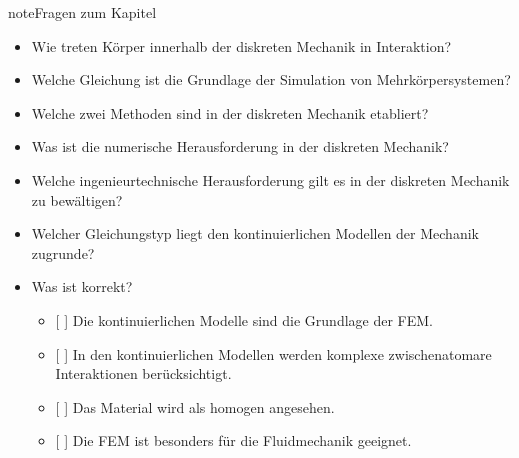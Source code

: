 \documentclass[letterpaper,10pt,german]{jupyterBook}
\begin{document}
\begin{sphinxadmonition}{note}{Fragen zum Kapitel}

\sphinxAtStartPar
{}
\begin{itemize}
\item {} 
\sphinxAtStartPar
Wie treten Körper innerhalb der diskreten Mechanik in Interaktion?

\item {} 
\sphinxAtStartPar
Welche Gleichung ist die Grundlage der Simulation von  Mehrkörpersystemen?

\item {} 
\sphinxAtStartPar
Welche zwei Methoden sind in der diskreten Mechanik etabliert?

\item {} 
\sphinxAtStartPar
Was ist die numerische Herausforderung in der diskreten Mechanik?

\item {} 
\sphinxAtStartPar
Welche ingenieurtechnische Herausforderung gilt es in der diskreten Mechanik zu bewältigen?

\end{itemize}

\sphinxAtStartPar
{}
\begin{itemize}
\item {} 
\sphinxAtStartPar
Welcher Gleichungstyp liegt den kontinuierlichen Modellen der Mechanik zugrunde?

\item {} 
\sphinxAtStartPar
Was ist korrekt?
\begin{itemize}
\item {} 
\sphinxAtStartPar
{[} {]} Die kontinuierlichen Modelle sind die Grundlage der FEM.

\item {} 
\sphinxAtStartPar
{[} {]} In den kontinuierlichen Modellen werden komplexe zwischenatomare Interaktionen berücksichtigt.

\item {} 
\sphinxAtStartPar
{[} {]} Das Material wird als homogen angesehen.

\item {} 
\sphinxAtStartPar
{[} {]} Die FEM ist besonders für die Fluidmechanik geeignet.

\end{itemize}

\end{itemize}
\end{sphinxadmonition}
\end{document}
